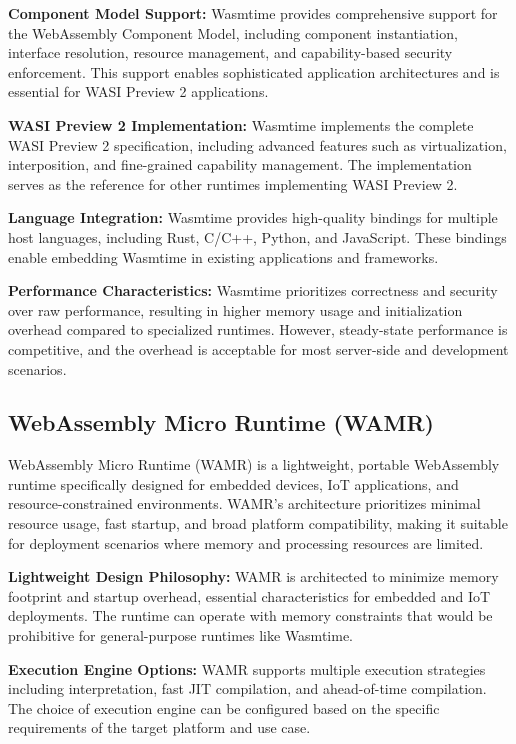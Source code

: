 \textbf{Component Model Support:} Wasmtime provides comprehensive support for the WebAssembly Component Model, including component instantiation, interface resolution, resource management, and capability-based security enforcement. This support enables sophisticated application architectures and is essential for WASI Preview 2 applications.

\textbf{WASI Preview 2 Implementation:} Wasmtime implements the complete WASI Preview 2 specification, including advanced features such as virtualization, interposition, and fine-grained capability management. The implementation serves as the reference for other runtimes implementing WASI Preview 2.

\textbf{Language Integration:} Wasmtime provides high-quality bindings for multiple host languages, including Rust, C/C++, Python, and JavaScript. These bindings enable embedding Wasmtime in existing applications and frameworks.

\textbf{Performance Characteristics:} Wasmtime prioritizes correctness and security over raw performance, resulting in higher memory usage and initialization overhead compared to specialized runtimes. However, steady-state performance is competitive, and the overhead is acceptable for most server-side and development scenarios.

\subsection{WebAssembly Micro Runtime (WAMR)}
\label{subsec:wamr}

WebAssembly Micro Runtime (WAMR) is a lightweight, portable WebAssembly runtime specifically designed for embedded devices, IoT applications, and resource-constrained environments\cite{wamr_project}. WAMR's architecture prioritizes minimal resource usage, fast startup, and broad platform compatibility, making it suitable for deployment scenarios where memory and processing resources are limited.


\textbf{Lightweight Design Philosophy:} WAMR is architected to minimize memory footprint and startup overhead, essential characteristics for embedded and IoT deployments. The runtime can operate with memory constraints that would be prohibitive for general-purpose runtimes like Wasmtime.

\textbf{Execution Engine Options:} WAMR supports multiple execution strategies including interpretation, fast JIT compilation, and ahead-of-time compilation. The choice of execution engine can be configured based on the specific requirements of the target platform and use case.

